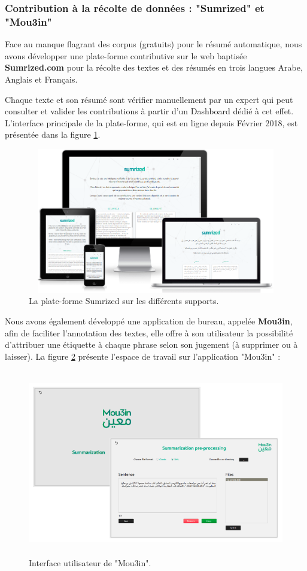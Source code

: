     \subsubsection{Contribution à la récolte de données : "Sumrized" et "Mou3in"}
    Face au manque flagrant des corpus (gratuits) pour le résumé automatique, nous avons développer une plate-forme contributive sur le web baptisée \textbf{Sumrized.com} pour la récolte des textes et des résumés en trois langues Arabe, Anglais et Français. 
    
    Chaque texte et son résumé sont vérifier manuellement par un expert qui peut consulter et valider les contributions à partir d'un Dashboard dédié à cet effet. L'interface principale de la plate-forme, qui est en ligne depuis Février 2018, est présentée dans la figure \ref{sumrized-ui}. 
    
    \begin{figure}[H]
        \centering
        \includegraphics[height=180pt,width=320pt]{img/chapter4/sumrized/responsive.png}
        \caption{La plate-forme Sumrized sur les différents supports.}
        \label{sumrized-ui}
    \end{figure} 
    
    Nous avons également développé une application de bureau, appelée \textbf{Mou3in}, afin de faciliter l'annotation des textes, elle offre à son utilisateur la possibilité d'attribuer une étiquette à chaque phrase selon son jugement (à supprimer ou à laisser). La figure \ref{mou3in} présente l'espace de travail sur l'application "Mou3in" :
    \begin{figure}[H]
        \centering
        \includegraphics[height=230pt,width=370pt]{img/chapter4/mou3in/mou3in.png}
        \caption{Interface utilisateur de "Mou3in".}
        \label{mou3in}
    \end{figure}
    
